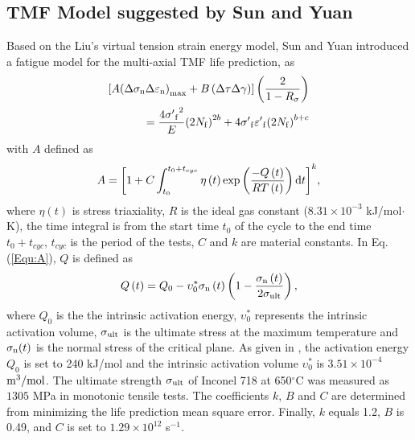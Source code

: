 \documentclass[preprint,5p,twocolumn,10pt,sort&compress]{elsarticle}
\begin{document}
\subsection{TMF Model suggested by Sun and Yuan  \cite{SUN2019228}}
Based on the Liu's virtual tension strain energy model, Sun and Yuan \cite{SUN2019228} introduced a fatigue model for the multi-axial TMF life prediction, as
\begin{equation}
\begin{aligned}
\left[ {A{{\left( {\Delta {\sigma _{\rm n}}\Delta {\varepsilon _{\rm n}}} \right)}_{\max }} + B\left( {\Delta \tau \Delta \gamma } \right)} \right]\left( {\frac{2}{{1 - {R_\sigma }}}} \right)\\
= \frac{{4{{\sigma '}_{\rm f}}^2}}{E}{\left( {2{N_{\rm f}}} \right)^{2b}} + 4{{\sigma '}_{\rm f}}{{\varepsilon '}_{\rm f}}{\left( {2{N_{\rm f}}} \right)^{b + c}}
\end{aligned}
\label{Equ:TMF_model}
\end{equation}
with $A$ defined as
\begin{equation}
A = {\left[ {1 + C\int_{{t_0}}^{{t_0} + {t_{cyc}}} {\eta \left( t \right)\exp \left( {\frac{{ - Q\left( t \right)}}{{RT\left( t \right)}}} \right){\rm{d}}t} } \right]^k},
\label{Equ:A}
\end{equation}
where $\eta \left( t \right)$ is stress triaxiality, $R$ is the ideal gas constant ($8.31\times10^{-3}$ kJ/mol$\cdot$K), the time integral is from the start time $t_0$ of the cycle to the end time $t_0 + t_{cyc}$, $t_{cyc}$ is the period of the tests, $C$ and $k$ are material constants.
In Eq. (\ref{Equ:A}), $Q$ is defined as \cite{Warren2006,Warren2008}
\begin{equation}
Q\left( t \right) = {Q_0} - \upsilon _0^*{\sigma _{\rm n}}\left( t \right)\left( {1 - \frac{{{\sigma _{\rm n}}\left( t \right)}}{{2{\sigma _{\rm ult}}}}} \right),
\label{Equ:creep_activation_energy}
\end{equation}
where $Q_0$ is the the intrinsic activation energy, $\upsilon _0^*$ represents the intrinsic activation volume, $\sigma_{\rm ult}$ is the ultimate stress at the maximum temperature and $\sigma_{\rm n}(t)$ is the normal stress of the critical plane.
As given in \cite{Warren2008}, the activation energy $Q_0$ is set to 240 kJ/mol and the intrinsic activation volume $\upsilon _0^*$ is $3.51\times10^{-4}$ $\rm{m}^{3}/\rm{mol}$. The ultimate strength $\sigma_{\rm ult}$ of Inconel 718 at 650$^\circ$C was measured as $1305$ MPa in monotonic tensile tests. The coefficients $k$, $B$ and $C$ are determined from minimizing the life prediction mean square error. Finally, $k$ equals 1.2, $B$ is 0.49, and $C$ is set to $1.29\times10^{12}$ s$^{-1}$.
\end{document}
